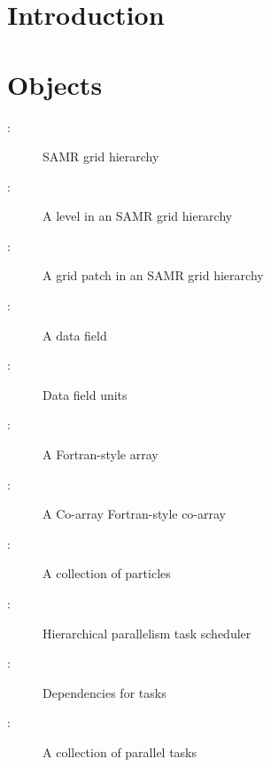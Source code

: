 \documentclass{article}
\begin{document}

\section{Introduction} \label{s:intro}




\section{Objects} \label{s:intro}

\begin{description}
\item[: ] SAMR grid hierarchy
\item[: ]     A level in an SAMR grid hierarchy
\item[: ]      A grid patch in an SAMR grid hierarchy
\item[: ]     A data field
\item[: ]     Data field units
\item[: ]     A Fortran-style array
\item[: ]   A Co-array Fortran-style co-array
\item[: ] A collection of particles
\item[: ]  Hierarchical parallelism task scheduler
\item[: ] Dependencies for tasks
\item[: ]     A collection of parallel tasks
\end{description}
\end{document}
